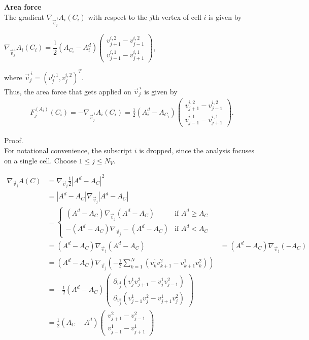 \begin{proposition} \textbf{Area force} \label{force:area}\\
	The gradient $\nabla_{\vec{v}^{\: i}_j} A_i(C_i)$ with respect to the $j$th vertex of cell $i$ is given by 
	\begin{center}
		$\nabla_{\vec{v}^{\: i}_j} A_i(C_i) = \dfrac{1}{2} (A_{C_i} - A_i^d) \begin{pmatrix} v_{j+1}^{i,2} - v_{j-1}^{i,2} \\[0.5em]  v_{j-1}^{i,1} - v_{j+1}^{i,1} \end{pmatrix}$, 
	\end{center}
	where $\vec{v}^{\: i}_j = (v_{j}^{i,1}, v_{j}^{i,2})^T$. \\

	Thus, the area force that gets applied on $\vec{v}^{\: i}_j$ is given by 
	\begin{align}
		F_{j}^{(A_i)}(C_i) 
		= - \nabla_{\vec{v}^{\: i}_j} A_i(C_i) 
		= \frac{1}{2}(A_i^d - A_{C_i}) \begin{pmatrix} v_{j+1}^{i,2} - v_{j-1}^{i,2} \\[0.5em]  v_{j-1}^{i,1} - v_{j+1}^{i,1} \end{pmatrix}.
	\end{align}



	Proof.\\
	For notational convenience, the subscript $i$ is dropped, since the analysis focuses on a single cell.
	Choose $1 \leq j \leq N_V$.  
 
	\begin{align*}
		\nabla_{\vec{v}_j} A(C) &= \nabla_{\vec{v}_j} \frac{1}{2} | A^d - A_{C} |^2  \\ 
		&=   |A^d - A_{C}| \nabla_{\vec{v}_j} | A^d - A_{C}|  \\
		&=  \begin{cases}
			(A^d - A_{C}) \nabla_{\vec{v}_j} (A^d - A_{C}) &\text{if } A^d \geq A_{C} \\[0.5em]
			-(A^d - A_{C}) \nabla_{\vec{v}_j} -(A^d - A_{C}) &\text{if } A^d < A_{C}
		\end{cases}\\
		&=  (A^d - A_{C}) \nabla_{\vec{v}_j} (A^d - A_{C})
		&=   (A^d - A_{C}) \nabla_{\vec{v}_j} ( - A_{C}) \\ 
		&=   (A^d - A_{C}) \nabla_{\vec{v}_j} ( - \frac{1}{2} \sum\limits_{k = 1}^{N} (v_k^1 v_{k+1}^2 - v_{k+1}^1 v_k^2)) \\[0.5em]  
		&=   - \frac{1}{2} (A^d - A_{C}) \begin{pmatrix}
			\partial_{v_j^1} (v_j^1 v_{j+1}^2 - v_j^1 v_{j-1}^2)  \\[0.5em]
			\partial_{v_j^2} (v_{j-1}^1 v_j^2 - v_{j+1}^1 v_j^2)
		\end{pmatrix} \\[0.5em] 
		&=   \frac{1}{2} (A_{C} - A^d) \begin{pmatrix}
			  v_{j+1}^2 - v_{j-1}^2  \\
			 v_{j-1}^1  - v_{j+1}^1 
		\end{pmatrix} 
	\end{align*}


\end{proposition}
